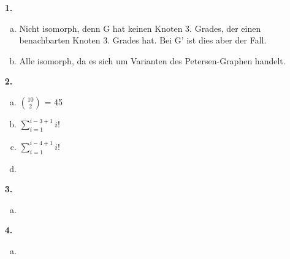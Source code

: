 \documentclass[a4paper]{scrartcl}
\title{\titleinfo}
\author{Elena Noll, Sven-Hendrik Haase, Arne Feil}
\date{\today}
\begin{document}
\maketitle

\begin{enumerate}
\item[\textbf{1.}]
\begin{enumerate}[a)]
\item Nicht isomorph, denn G hat keinen Knoten 3. Grades, der einen benachbarten Knoten 3. Grades hat. Bei G' ist dies aber der Fall.
\item Alle isomorph, da es sich um Varianten des Petersen-Graphen handelt.
\end{enumerate}
\item[\textbf{2.}]
\begin{enumerate}[a)]
\item \({10 \choose 2}\) = 45
\item \(\sum\limits_{i=1}^{i-3+1}i!\)
\item \(\sum\limits_{i=1}^{i-4+1}i!\)
\item 
\end{enumerate}
\item[\textbf{3.}]
\begin{enumerate}[a)]
\item
\end{enumerate}
\item[\textbf{4.}]
\begin{enumerate}[a)]
\item
\end{enumerate}
\end{enumerate}
\end{document}
